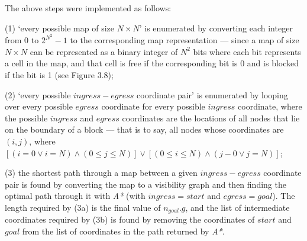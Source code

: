 \documentclass[12pt,notitlepage]{report}
\begin{document}
\noindent
The above steps were implemented as follows:
\begin{description}
\item (1) `every possible map of size $N \times N$' is enumerated by converting each integer from $0$ to $2^{N^{2}}-1$ to the corresponding map representation --- since a map of size $N \times N$ can be represented as a binary integer of $N^{2}$ bits where each bit represents a cell in the map, and that cell is free if the corresponding bit is 0 and is blocked if the bit is 1 (see Figure 3.8);
\item (2) `every possible $ingress-egress$ coordinate pair' is enumerated by looping over every possible $egress$ coordinate for every possible $ingress$ coordinate, where the possible $ingress$ and $egress$ coordinates are the locations of all nodes that lie on the boundary of a block --- that is to say, all nodes whose coordinates are $(i,j)$, where $[(i=0 \lor i=N) \land (0\leq j \leq N)] \lor [(0\leq i \leq N) \land (j-0 \lor j=N)]$;
\item (3) the shortest path through a map between a given $ingress-egress$ coordinate pair is found by converting the map to a visibility graph and then finding the optimal path through it with {\em A*} (with $ingress = start$ and $egress=goal$). The length required by (3a) is the final value of $n_{goal}.g$, and the list of intermediate coordinates required by (3b) is found by removing the coordinates of $start$ and $goal$ from the list of coordinates in the path returned by {\em A*}.
\end{description}
\end{document}
